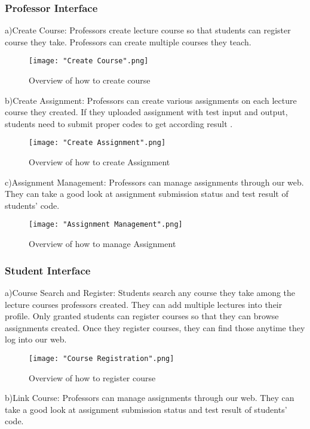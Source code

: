 \documentclass[10pt,journal,compsoc]{IEEEtran}
\begin{document}
\subsubsection {Professor Interface}
\qquad a)Create Course: Professors create lecture course so that students can register course they take. Professors can create multiple courses they teach.
\begin{figure}[H]
\centering
\texttt{[image: "Create Course".png]}
{\caption*{Overview of how to create course}}
\end{figure}

\qquad b)Create Assignment: Professors can create various assignments on each lecture course they created. If they uploaded assignment with test input and output, students need to submit proper codes to get according result
.
\begin{figure}[H]
\centering
\texttt{[image: "Create Assignment".png]}
{\caption*{Overview of how to create Assignment}}
\end{figure}
c)Assignment Management: Professors can manage assignments through our web. They can take a good look at assignment submission status and test result of students’ code. 

\begin{figure}[H]
\centering
\texttt{[image: "Assignment Management".png]}
{\caption*{Overview of how to manage Assignment}}
\end{figure}

\subsubsection{Student Interface}
a)Course Search and Register: Students search any course they take among the lecture courses professors created. They can add multiple lectures into their profile. Only granted students can register courses so that they can browse assignments created. Once they register courses, they can find those anytime they log into our web.

\begin{figure}[H]
\centering
\texttt{[image: "Course Registration".png]}
{\caption*{Overview of how to register course}}
\end{figure}

b)Link Course: Professors can manage assignments through our web. They can take a good look at assignment submission status and test result of students’ code.
\end{document}
